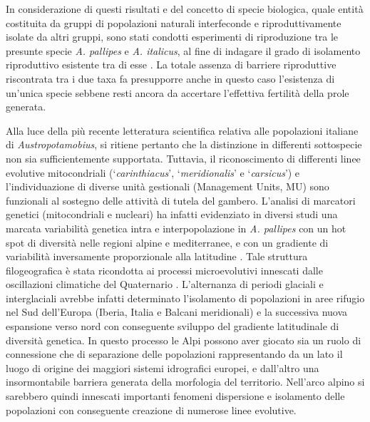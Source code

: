\documentclass[11pt,a4paper,italian,twoside,openany]{memoir}
\begin{document}
In considerazione di questi risultati e del concetto di specie biologica, quale entità costituita da gruppi di popolazioni naturali interfeconde e riproduttivamente isolate da altri gruppi, sono stati condotti esperimenti di riproduzione tra le presunte specie \emph{A. pallipes} e \emph{A. italicus}, al fine di indagare il grado di isolamento riproduttivo esistente tra di esse \cite{Ghia 2011}. La totale assenza di barriere riproduttive riscontrata tra i due taxa fa presupporre anche in questo caso l'esistenza di un'unica specie sebbene resti ancora da accertare l'effettiva fertilità della prole generata.

Alla luce della più recente letteratura scientifica relativa alle popolazioni italiane di \emph{Austropotamobius}, si ritiene pertanto che la distinzione in differenti sottospecie non sia sufficientemente supportata. Tuttavia, il riconoscimento di differenti linee evolutive mitocondriali (‘\emph{carinthiacus}', ‘\emph{meridionalis}' e ‘\emph{carsicus}') e l'individuazione di diverse unità gestionali (Management Units, MU) sono funzionali al sostegno delle attività di tutela del gambero. L'analisi di marcatori genetici (mitocondriali e nucleari) ha infatti evidenziato in diversi studi una marcata variabilità genetica intra e interpopolazione in \emph{A. pallipes} con un hot spot di diversità nelle regioni alpine e mediterranee, e con un gradiente di variabilità inversamente proporzionale alla latitudine \cite{Grandjean 2000b} \cite{Gouin 2001} \cite{Baric 2005} \cite{Fratini 2005} \cite{Gouin 2006} \cite{Bertocchi 2008}. Tale struttura filogeografica è stata ricondotta ai processi microevolutivi innescati dalle oscillazioni climatiche del Quaternario \cite{Grandjean 2000b}. L'alternanza di periodi glaciali e interglaciali avrebbe infatti determinato l'isolamento di popolazioni in aree rifugio nel Sud dell'Europa (Iberia, Italia e Balcani meridionali) e la successiva nuova espansione verso nord \cite{Hewitt 1996} con conseguente sviluppo del gradiente latitudinale di diversità genetica. In questo processo le Alpi possono aver giocato sia un ruolo di connessione che di separazione delle popolazioni rappresentando da un lato il luogo di origine dei maggiori sistemi idrografici europei, e dall'altro una insormontabile barriera generata della morfologia del territorio. Nell'arco alpino si sarebbero quindi innescati importanti fenomeni dispersione e isolamento delle popolazioni con conseguente creazione di numerose linee evolutive. 
\end{document}
